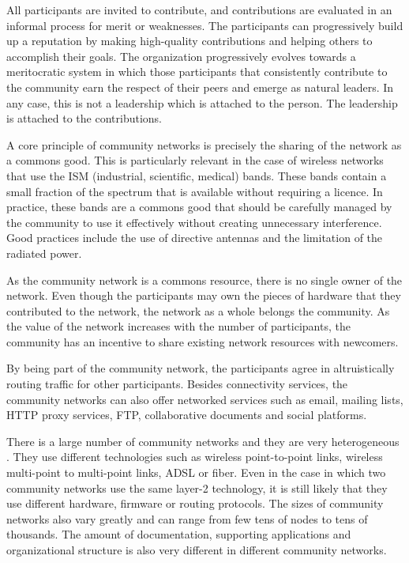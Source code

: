 \documentclass[journal]{IEEEtran}
\begin{document}
All participants are invited to contribute, and contributions are evaluated in an informal process for merit or weaknesses.
The participants can progressively build up a reputation by making high-quality contributions and helping others to accomplish their goals.
The organization progressively evolves towards a meritocratic system in which those participants that consistently contribute to the community earn the respect of their peers and emerge as natural leaders.
In any case, this is not a leadership which is attached to the person. 
The leadership is attached to the contributions.

A core principle of community networks is precisely the sharing of the network as a commons good.
This is particularly relevant in the case of wireless networks that use the ISM (industrial, scientific, medical) bands.
These bands contain a small fraction of the spectrum that is available without requiring a licence. 
In practice, these bands are a commons good that should be carefully managed by the community to use it effectively without creating unnecessary interference.
Good practices include the use of directive antennas and the limitation of the radiated power.

As the community network is a commons resource, there is no single owner of the network.
Even though the participants may own the pieces of hardware that they contributed to the network, the network as a whole belongs the community.
As the value of the network increases with the number of participants, the community has an incentive to share existing network resources with newcomers.

By being part of the community network, the participants agree in altruistically routing traffic for other participants.
Besides connectivity services, the community networks can also offer networked services such as email, mailing lists, HTTP proxy services, FTP, collaborative documents and social platforms.

There is a large number of community networks and they are very heterogeneous \cite{avonts2013qbe}.
They use different technologies such as wireless point-to-point links, wireless multi-point to multi-point links, ADSL or fiber.
Even in the case in which two community networks use the same layer-2 technology, it is still likely that they use different hardware, firmware or routing protocols.
The sizes of community networks also vary greatly and can range from few tens of nodes to tens of thousands.
The amount of documentation, supporting applications and organizational structure is also very different in different community networks.
\end{document}
